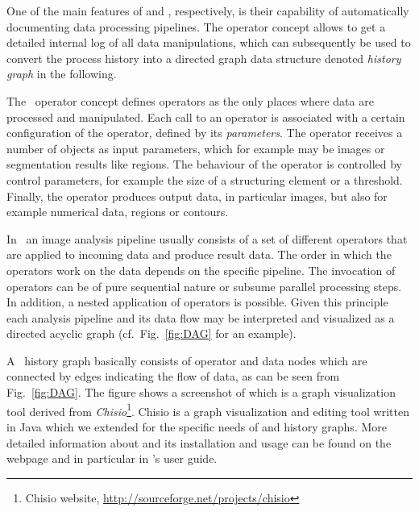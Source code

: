 One of the main features of \mitobo and \alida, respectively, is their capability of automatically documenting data processing
pipelines. The operator concept allows to get a detailed internal log of all data manipulations, which
can subsequently be used to convert the
process history into a directed graph data structure denoted {\em history graph} in the following.
 
The \mitobo\ operator concept defines operators as the only places where data are processed and manipulated. 
Each call to an operator is associated with a certain configuration of the operator, defined by its {\em parameters}. 
The operator receives a number of objects as input parameters, 
which for example may be images or segmentation results like regions. The behaviour of the operator is controlled by control 
parameters, for example the size of a structuring element or a threshold. 
Finally, the operator produces output data, in particular images, but also for example numerical data,
regions or contours.

In \mitobo\ an image analysis pipeline usually consists of a set of different operators that are applied to incoming data and
produce result data. The order in which the operators work on the data depends on the specific pipeline. The invocation of
operators can be of pure sequential nature or subsume parallel processing steps. In addition, a nested application
of operators is possible. Given this principle each analysis pipeline and its
data flow may be interpreted
and visualized as a directed acyclic graph (cf.~Fig.~\ref{fig:DAG} for an
example).

A \mitobo\ history graph basically consists of operator and data nodes which are connected by edges 
indicating the flow of data, as can be seen from Fig.~\ref{fig:DAG}. 
The figure shows a screenshot of \mtbc which is a graph visualization tool derived from {\em Chisio}\footnote{
Chisio website, \href{http://sourceforge.net/projects/chisio}{http://sourceforge.net/projects/chisio}}.
Chisio is a graph visualization and editing tool written in Java which we extended for the specific needs of \alida and 
\mitobo history graphs.
More detailed information about \mtbc and its installation and usage can be found on the \alida webpage and in particular 
in \alida's user guide.

